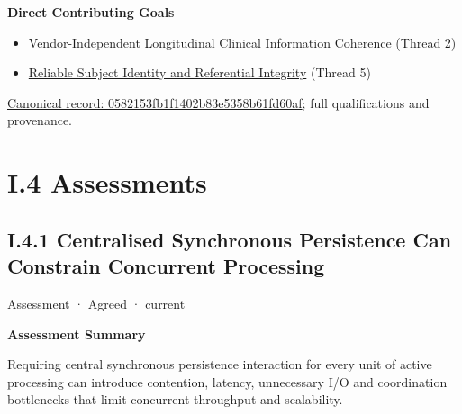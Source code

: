 \par\medskip\textbf{Direct Contributing Goals}\par


\begin{itemize}


\item \href{\detokenize{../../../../../../../../docs/markdown/01-motivation/goals-outcomes/strategic-goals.md}}{Vendor-Independent Longitudinal Clinical Information Coherence} (Thread 2)

\item \href{\detokenize{../../../../../../../../docs/markdown/01-motivation/goals-outcomes/strategic-goals.md}}{Reliable Subject Identity and Referential Integrity} (Thread 5)

\end{itemize}

{\footnotesize \href{../../../../../../../continuum/motivation/outcome/0582153fb1f1402b83e5358b61fd60af.md}{Canonical record: 0582153fb1f1402b83e5358b61fd60af}; full qualifications and provenance.}\par
\chapter*{I.4 Assessments}
\label{navigation:I.4}

\section*{I.4.1 Centralised Synchronous Persistence Can Constrain Concurrent Processing}
\label{navigation:I.4.1}

\label{element:4f7b18cecb08415bad2b4247068a511e}
{\small Assessment · Agreed · current}\par

\par\medskip\textbf{Assessment Summary}\par


Requiring central synchronous persistence interaction for every unit of active processing can introduce contention, latency, unnecessary I/O and coordination bottlenecks that limit concurrent throughput and scalability.



